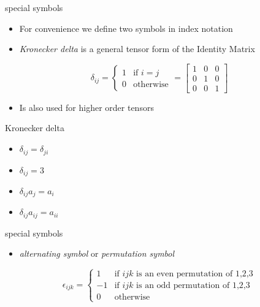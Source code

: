 \documentclass[
  letterpaper,
  ignorenonframetext,
  aspectratio=43,
  handout,
  12pt]{beamer}
\providecommand{\tightlist}{%
  \setlength{\itemsep}{0pt}\setlength{\parskip}{0pt}}
\providecommand{\tightlist}{%
\setlength{\itemsep}{0pt}\setlength{\parskip}{0pt}}
\begin{document}
\begin{frame}{special symbols}
\protect\hypertarget{special-symbols}{}
\begin{itemize}
\tightlist
\item
  For convenience we define two symbols in index notation
\item
  \emph{Kronecker delta} is a general tensor form of the Identity Matrix
\end{itemize}

\[\delta_{ij} = \left\{
\begin{array}{ll}
1& \text{if $i=j$}\\
0& \text{otherwise}
\end{array}
\right. = \begin{bmatrix}
1 & 0 & 0\\
0 & 1 & 0 \\
0 & 0 & 1
\end{bmatrix}\]

\begin{itemize}
\tightlist
\item
  Is also used for higher order tensors
\end{itemize}
\end{frame}

\begin{frame}{Kronecker delta}
\protect\hypertarget{kronecker-delta}{}
\begin{itemize}
\tightlist
\item
  \(\delta_{ij} = \delta_{ji}\)
\item
  \(\delta_{ij} = 3\)
\item
  \(\delta_{ij} a_j = a_i\)
\item
  \(\delta_{ij}a_{ij} = a_{ii}\)
\end{itemize}
\end{frame}

\begin{frame}{special symbols}
\protect\hypertarget{special-symbols-1}{}
\begin{itemize}
\tightlist
\item
  \emph{alternating symbol} or \emph{permutation symbol}
\end{itemize}

\[\epsilon_{ijk} = \left \{
\begin{array}{rl}
1 & \text{if $ijk$ is an even permutation of 1,2,3}\\
-1 & \text{if $ijk$ is an odd permutation of 1,2,3}\\
0 & \text{otherwise}
\end{array}
\right.\]
\end{frame}
\end{document}
